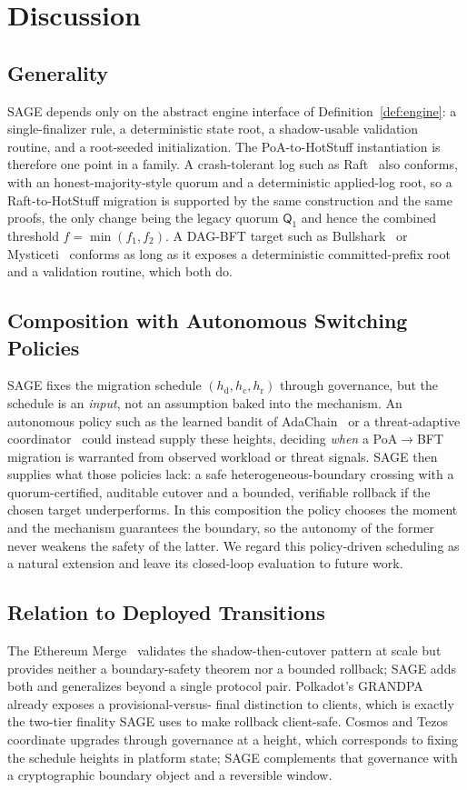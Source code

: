 \documentclass[journal]{IEEEtran}
\theoremstyle{remark}
\begin{document}
\section{Discussion}
\label{sec:discussion}

\subsection{Generality}
SAGE depends only on the abstract engine interface of Definition~\ref{def:engine}: a
single-finalizer rule, a deterministic state root, a shadow-usable validation routine, and a
root-seeded initialization. The PoA-to-HotStuff instantiation is therefore one point in a
family. A crash-tolerant log such as Raft~\cite{raft} also conforms, with an
honest-majority-style quorum and a deterministic applied-log root, so a Raft-to-HotStuff
migration is supported by the same construction and the same proofs, the only change being the
legacy quorum $\mathsf{Q}_1$ and hence the combined threshold $f=\min(f_1,f_2)$. A
DAG-BFT target such as Bullshark~\cite{bullshark} or Mysticeti~\cite{mysticeti} conforms as long
as it exposes a deterministic committed-prefix root and a validation routine, which both do.

\subsection{Composition with Autonomous Switching Policies}
SAGE fixes the migration schedule $(h_{\mathrm{d}}, h_{\mathrm{c}}, h_{\mathrm{r}})$ through governance,
but the schedule is an \emph{input}, not an assumption baked into the mechanism. An autonomous policy
such as the learned bandit of AdaChain~\cite{adachain} or a threat-adaptive
coordinator~\cite{threatadapt,adacon} could instead supply these heights, deciding \emph{when} a
PoA$\rightarrow$BFT migration is warranted from observed workload or threat signals. SAGE then supplies
what those policies lack: a safe heterogeneous-boundary crossing with a quorum-certified, auditable
cutover and a bounded, verifiable rollback if the chosen target underperforms. In this composition the
policy chooses the moment and the mechanism guarantees the boundary, so the autonomy of the former never
weakens the safety of the latter. We regard this policy-driven scheduling as a natural extension and
leave its closed-loop evaluation to future work.

\subsection{Relation to Deployed Transitions}
The Ethereum Merge~\cite{gasper} validates the shadow-then-cutover pattern at scale but provides
neither a boundary-safety theorem nor a bounded rollback; SAGE adds both and generalizes beyond
a single protocol pair. Polkadot's GRANDPA~\cite{grandpa} already exposes a provisional-versus-
final distinction to clients, which is exactly the two-tier finality SAGE uses to make rollback
client-safe. Cosmos and Tezos~\cite{tenderbake} coordinate upgrades through governance at a
height, which corresponds to fixing the schedule heights in platform state; SAGE complements
that governance with a cryptographic boundary object and a reversible window.
\end{document}
